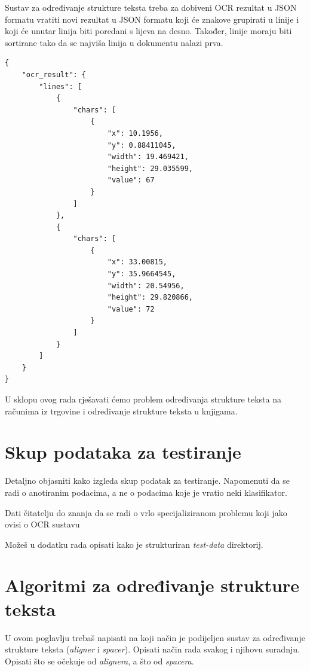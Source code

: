 \documentclass[times, utf8, zavrsni]{fer}
\begin{document}
Sustav za određivanje strukture teksta treba za dobiveni OCR rezultat u JSON formatu vratiti novi
rezultat u JSON formatu koji će znakove grupirati u linije i koji će unutar linija biti poredani
s lijeva na desno. Također, linije moraju biti sortirane tako da se najviša linija u dokumentu nalazi
prva.

\pagebreak

\begin{lstlisting}[frame=single,caption={Rezultat OCR-a u JSON formatu},label={lst:ocr-result-json-01},language=HTML]
{
    "ocr_result": {
        "lines": [
            {
                "chars": [
                    {
                        "x": 10.1956,
                        "y": 0.88411045,
                        "width": 19.469421,
                        "height": 29.035599,
                        "value": 67
                    }
                ]
            },
            {
                "chars": [
                    {
                        "x": 33.00815,
                        "y": 35.9664545,
                        "width": 20.54956,
                        "height": 29.820866,
                        "value": 72
                    }
                ]
            }
        ]
    }
}
\end{lstlisting}

U sklopu ovog rada rješavati ćemo problem određivanja strukture teksta
na računima iz trgovine i određivanje strukture teksta u knjigama.

\chapter{Skup podataka za testiranje}
Detaljno objasniti kako izgleda skup podatak za testiranje. Napomenuti da se
radi o anotiranim podacima, a ne o podacima koje je vratio neki klasifikator.

Dati čitatelju do znanja da se radi o vrlo specijaliziranom problemu koji
jako ovisi o OCR sustavu

Možeš u dodatku rada opisati kako je strukturiran \emph{test-data} direktorij.

\chapter{Algoritmi za određivanje strukture teksta}
U ovom poglavlju trebaš napisati na koji način je podijeljen sustav za određivanje
strukture teksta (\emph{aligner} i \emph{spacer}). Opisati način rada svakog
i njihovu suradnju. Opisati što se očekuje od \emph{alignera}, a što od \emph{spacera}.
\end{document}
